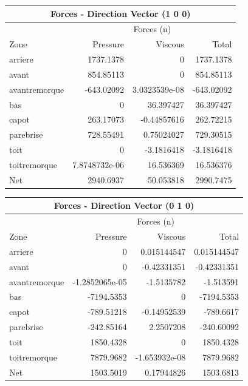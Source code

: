 \begin{center}\begin{tabular}{|l|r r r|}
\hline
\multicolumn{4}{|c|}{Forces - Direction Vector (1 0 0)} \\
\hline
                     &    \multicolumn{3}{c|}{Forces (n)} \\                                
\hline
Zone                 &    Pressure       & Viscous        & Total     \\ 
\hline
arriere              &    1737.1378      & 0              & 1737.1378 \\ 
avant                &    854.85113      & 0              & 854.85113 \\ 
avantremorque        &    -643.02092     & 3.0323539e-08  & -643.02092\\ 
bas                  &    0              & 36.397427      & 36.397427 \\ 
capot                &    263.17073      & -0.44857616    & 262.72215 \\ 
parebrise            &    728.55491      & 0.75024027     & 729.30515 \\ 
toit                 &    0              & -3.1816418     & -3.1816418\\ 
toitremorque         &    7.8748732e-06  & 16.536369      & 16.536376 \\ 
\hline
\hline
Net                  &    2940.6937      & 50.053818      & 2990.7475 \\ 
\hline
\end{tabular}


\begin{tabular}{|l|r r r|}
\hline
\multicolumn{4}{|c|}{Forces - Direction Vector (0 1 0)} \\
\hline
                        &  \multicolumn{3}{c|}{Forces (n)} \\
\hline
Zone                    & Pressure      &  Viscous       &  Total      \\ 
\hline
arriere                 & 0             &  0.015144547   &  0.015144547\\
avant                   & 0             &  -0.42331351   &  -0.42331351\\
avantremorque           & -1.2852065e-05&  -1.5135782    &  -1.513591  \\
bas                     & -7194.5353    &  0             &  -7194.5353 \\
capot                   & -789.51218    &  -0.14952539   &  -789.6617  \\
parebrise               & -242.85164    &  2.2507208     &  -240.60092 \\
toit                    & 1850.4328     &  0             &  1850.4328  \\
toitremorque            & 7879.9682     &  -1.653932e-08 &  7879.9682  \\
\hline
\hline
Net                     & 1503.5019     &  0.17944826    &  1503.6813  \\
\hline
\end{tabular} \end{center}

